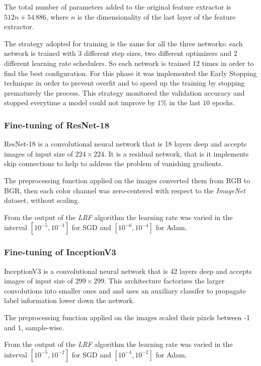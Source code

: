 The total number of parameters added to the original feature extractor is $512n + 54\,886$, where $n$ is the dimensionality of the last layer of the feature extractor.\par
The strategy adopted for training is the same for all the three networks: each network is trained with 3 different step sizes, two different optimizers and 2 different learning rate schedulers. So each network is trained 12 times in order to find the best configuration. For this phase it was implemented the Early Stopping technique in order to prevent overfit and to speed up the training by stopping prematurely the process. This strategy monitored the validation accuracy and stopped everytime a model could not improve by $1\%$ in the last $10$ epochs.



\subsubsection{Fine-tuning of ResNet-18}\label{sec:resnet18}
ResNet-18 is a convolutional neural network that is 18 layers deep and accepts images of input size of $224 \times 224$. It is a residual network, that is it implements skip connections to help to address the problem of vanishing  gradients. \par
The preprocessing function applied on the images converted them from RGB to BGR, then each color channel was zero-centered with respect to the \textit{ImageNet} dataset, without scaling. \par
From the output of the \textit{LRF} algorithm the learning rate was varied in the interval $[10^{-5}, 10^{-3}]$ for SGD and $[10^{-6}, 10^{-4}]$ for Adam.


\subsubsection{Fine-tuning of InceptionV3}\label{sec:inceptionv3}
InceptionV3 is a convolutional neural network that is 42 layers deep and accepts images of input size of $299 \times 299$. This architecture factorizes the larger convolutions  into smaller ones and and uses an auxiliary classifer to propagate label information lower down the network.
 \par
The preprocessing function applied on the images scaled their pixels between -1 and 1, sample-wise. \par
From the output of the \textit{LRF} algorithm the learning rate was varied in the interval $[10^{-5}, 10^{-2}]$ for SGD and $[10^{-4}, 10^{-2}]$ for Adam.



